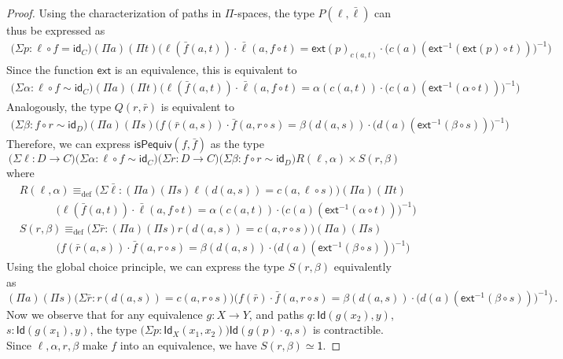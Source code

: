 \documentclass[10pt,a4paper,oneside,reqno]{amsart}
\numberwithin{equation}{section}
\theoremstyle{mythm}
\theoremstyle{mydef}
\theoremstyle{myrmk}
\newcommand{\deq}{\equiv}
\newcommand{\defeq}{\deq_{\mathrm{def}}}
\newcommand{\idfun}[1]{\mathsf{id}_{#1}}
\newcommand{\comp}{\circ}
\newcommand{\ext}{\mathsf{ext}}
\newcommand{\ct}{\cdot}
\newcommand{\Id}{\mathsf{Id}}
\newcommand{\one}{\mathsf{1}}
\begin{document}
\begin{proof}
Using the characterization of paths in $\Pi$-spaces, the type $P(\ell,\bar{\ell})$ can thus be expressed as
\begin{align*}
\big(\Sigma p : \ell \comp f = \idfun{C} \big) (\Pi a) (\Pi t) \Big(\ell(\bar{f}(a,t)) \ct \bar{\ell}(a, f \comp t) = \ext(p)_{c(a,t)} \ct \big(c(a)(\ext^{-1}(\ext(p) \circ t))\big)^{-1}\Big)
\end{align*}
Since the function $\ext$ is an equivalence, this is equivalent to
\begin{align*}
\big(\Sigma \alpha : \ell \circ f \sim \idfun{C} \big) (\Pi a) (\Pi t) \Big(\ell(\bar{f}(a,t)) \ct \bar{\ell}(a, f \comp t) = \alpha(c(a,t)) \ct \big(c(a)(\ext^{-1}(\alpha \circ t))\big)^{-1}\Big)
\end{align*}
Analogously, the type $Q(r,\bar{r})$ is equivalent to
\begin{align*}
\big(\Sigma \beta : f \comp r \sim \idfun{D} \big) (\Pi a) (\Pi s) \Big(f(\bar{r}(a,s)) \ct \bar{f}(a, r \comp s) = \beta(d(a,s)) \ct \big(d(a)(\ext^{-1}(\beta \circ s))\big)^{-1}\Big)
\end{align*}
Therefore, we can express $\mathsf{isPequiv}(f,\bar{f})$ as the type
\[ \big(\Sigma \ell : D\to C) \big(\Sigma \alpha : \ell \circ f \sim \idfun{C}\big) \big(\Sigma r : D\to C) \big(\Sigma \beta : f \circ r \sim \idfun{D}\big) R(\ell,\alpha) \times S(r,\beta)\]
where
\begin{align*}
& R(\ell,\alpha) \defeq \big(\Sigma \bar{\ell} : (\Pi a) (\Pi s) \ell(d(a,s))=c(a,\ell \circ s)\big) (\Pi a) (\Pi t) \\ & \;\;\;\;\;\;\;\;\;\;\;\; \Big(\ell(\bar{f}(a,t)) \ct \bar{\ell}(a, f \comp t) = \alpha(c(a,t)) \ct \big(c(a)(\ext^{-1}(\alpha \circ t))\big)^{-1}\Big) \\
& S(r,\beta) \defeq \big(\Sigma \bar{r} : (\Pi a) (\Pi s) r(d(a,s))=c(a,r \circ s) \big) (\Pi a) (\Pi s) \\ & \;\;\;\;\;\;\;\;\;\;\;\; \Big(f(\bar{r}(a,s)) \ct \bar{f}(a, r \comp s) = \beta(d(a,s)) \ct \big(d(a)(\ext^{-1}(\beta \circ s))\big)^{-1}\Big)
\end{align*}
Using the global choice principle, we can express the type $S(r,\beta)$ equivalently as
\[  (\Pi a) (\Pi s) \big(\Sigma \bar{r} : r(d(a,s))=c(a,r \circ s) \big) \Big(f(\bar{r}) \ct \bar{f}(a, r \comp s) = \beta(d(a,s)) \ct \big(d(a)(\ext^{-1}(\beta \circ s))\big)^{-1}\Big) \, .
\]
Now we observe that for any equivalence $g : X \to Y$, and paths $q : \Id(g(x_2),y)$, $s : \Id(g(x_1),y)$, the type $\big(\Sigma p : \Id_X(x_1,x_2)\big) \Id(g(p) \ct q,s)$ is contractible. Since $\ell, \alpha, r, \beta$ make $f$ into an equivalence, we have $S(r,\beta) \simeq \one$.


\end{proof}
\end{document}
